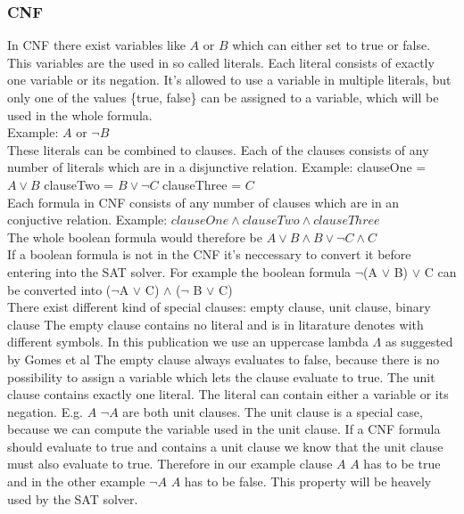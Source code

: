 \subsubsection{CNF}
In CNF there exist variables like $A$ or $B$ which can either set to true or false.
This variables are the used in so called literals. Each literal consists of exactly one variable or its negation. It's allowed to use a variable in multiple literals, but only one of the values \{true, false\} can be assigned to a variable, which will be used in the whole formula.\\
Example: $A$ or $\lnot B$\\
These literals can be combined to clauses. Each of the clauses consists of any number of literals which are in a disjunctive relation. 
Example: clauseOne = $A \lor B$ clauseTwo = $B \lor \lnot C$ clauseThree = $C$\\
Each formula in CNF consists of any number of clauses which are in an conjuctive relation. Example: $clauseOne \land clauseTwo \land clauseThree$\\
The whole boolean formula would therefore be $A \lor B \land B \lor \lnot C \land C$\\
If a boolean formula is not in the CNF it's neccessary to convert it before entering into the SAT solver. For example the boolean formula $\lnot$(A $\lor$ B) $\lor$ C can be converted into ($\lnot$A $\lor$ C) $\land$ ($\lnot$ B $\lor$ C)\\
There exist different kind of special clauses: empty clause, unit clause, binary clause
The empty clause contains no literal and is in litarature denotes with different symbols. In this publication we use an uppercase lambda $\Lambda$ as suggested by Gomes et al \cite{Gomes2008SatisfiabilityS}
The empty clause always evaluates to false, because there is no possibility to assign a variable which lets the clause evaluate to true.
The unit clause contains exactly one literal. The literal can contain either a variable or its negation. E.g. $A$ $\lnot A$ are both unit clauses. The unit clause is a special case, because we can compute the variable used in the unit clause. If a CNF formula should evaluate to true and contains a unit clause we know that the unit clause must also evaluate to true. Therefore in our example clause  $A$ $A$ has to be true and in the other example $\lnot A$ $A$ has to be false. This property will be heavely used by the SAT solver.
